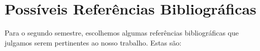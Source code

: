 \chapter{Possíveis Referências Bibliográficas} %
\label{cha:poss_veis_refer_ncias_bibliogr_ficas}

Para o segundo semestre, escolhemos algumas referências bibliográficas que julgamos serem pertinentes ao nosso trabalho. Estas são:

  
